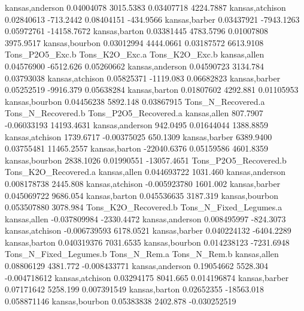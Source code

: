 \documentclass{report}
\begin{document}
\begin{Schunk}
\begin{Soutput}
kansas,anderson   0.04004078    3015.5383   0.03407718       4224.7887
kansas,atchison   0.02840613    -713.2442   0.08404151       -434.9566
kansas,barber     0.03437921   -7943.1263   0.05972761     -14158.7672
kansas,barton     0.03381445    4783.5796   0.01007808       3975.9517
kansas,bourbon    0.03012994    4444.0661   0.03187572       6613.9108
                Tons_P2O5_Exc.b Tons_K2O_Exc.a Tons_K2O_Exc.b
kansas,allen         0.04576900      -6512.626     0.05260662
kansas,anderson      0.04590723       3134.784     0.03793038
kansas,atchison      0.05825371      -1119.083     0.06682823
kansas,barber        0.05252519      -9916.379     0.05638284
kansas,barton        0.01807602       4292.881     0.01105953
kansas,bourbon       0.04456238       5892.148     0.03867915
                Tons_N_Recovered.a Tons_N_Recovered.b Tons_P2O5_Recovered.a
kansas,allen              807.7907        -0.06033193            14193.4631
kansas,anderson           942.0495         0.01644044             1388.8859
kansas,atchison          1739.6717        -0.00375025              650.1309
kansas,barber            6389.9400         0.03755481            11465.2557
kansas,barton          -22040.6376         0.05159586             4601.8359
kansas,bourbon           2838.1026         0.01990551           -13057.4651
                Tons_P2O5_Recovered.b Tons_K2O_Recovered.a
kansas,allen              0.044693722             1031.460
kansas,anderson           0.008178738             2445.808
kansas,atchison          -0.005923780             1601.002
kansas,barber             0.045069722             9686.054
kansas,barton             0.045536635             3187.319
kansas,bourbon            0.053507880             3078.984
                Tons_K2O_Recovered.b Tons_N_Fixed_Legumes.a
kansas,allen            -0.037809984             -2330.4472
kansas,anderson          0.008495997              -824.3073
kansas,atchison         -0.006739593              6178.0521
kansas,barber            0.040224132             -6404.2289
kansas,barton            0.040319376              7031.6535
kansas,bourbon           0.014238123             -7231.6948
                Tons_N_Fixed_Legumes.b Tons_N_Rem.a Tons_N_Rem.b
kansas,allen                0.08806129     4381.772 -0.008433771
kansas,anderson             0.19054662     5528.304 -0.004718612
kansas,atchison             0.03294175     8041.665  0.014196874
kansas,barber               0.07171642     5258.199  0.007391549
kansas,barton               0.02652355   -18563.018  0.058871146
kansas,bourbon              0.05383838     2402.878 -0.030252519

\end{Soutput}
\end{Schunk}
\end{document}

